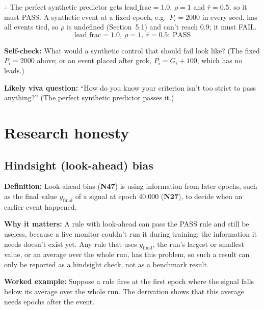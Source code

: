 \documentclass[11pt,a4paper,oneside,openany]{report}
\newcommand{\leadfrac}{\mathrm{lead\_frac}}
\newcommand{\rbar}{\bar{r}}
\newcommand{\yfinal}{y_{\mathrm{final}}}
\newcommand{\gl}[1]{\textbf{#1}}   %
\newcommand{\fdef}{\textbf{Definition:} }
\newcommand{\fwhy}{\par\textbf{Why it matters:} }
\newcommand{\fex}{\par\textbf{Worked example:} }
\newcommand{\fself}{\par\textbf{Self-check:} }
\newcommand{\fviva}{\par\textbf{Likely viva question:} }
\begin{document}
$\therefore$ The perfect synthetic predictor gets $\leadfrac = 1.0$, $\rho = 1$ and $\rbar = 0.5$, so it must PASS. A synthetic event at a fixed epoch, e.g.\ $P_i = 2000$ in every seed, has all events tied, so $\rho$ is undefined (Section~5.1) and can't reach 0.9; it must FAIL.
\[\boxed{\leadfrac = 1.0, \ \rho = 1, \ \rbar = 0.5: \ \text{PASS}}\]

\fself What would a synthetic control that should fail look like? (The fixed $P_i = 2000$ above; or an event placed after grok, $P_i = G_i + 100$, which has no leads.)
\fviva ``How do you know your criterion isn't too strict to pass anything?'' (The perfect synthetic predictor passes it.)

\chapter{Research honesty}

\section{Hindsight (look-ahead) bias}
\fdef Look-ahead bias (\gl{N47}) is using information from later epochs, such as the final value $\yfinal$ of a signal at epoch 40{,}000 (\gl{N27}), to decide when an earlier event happened.
\fwhy A rule with look-ahead can pass the PASS rule and still be useless, because a live monitor couldn't run it during training: the information it needs doesn't exist yet. Any rule that uses $\yfinal$, the run's largest or smallest value, or an average over the whole run, has this problem, so such a result can only be reported as a hindsight check, not as a benchmark result.
\fex Suppose a rule fires at the first epoch where the signal falls below its average over the whole run. The derivation shows that this average needs epochs after the event.
\end{document}
